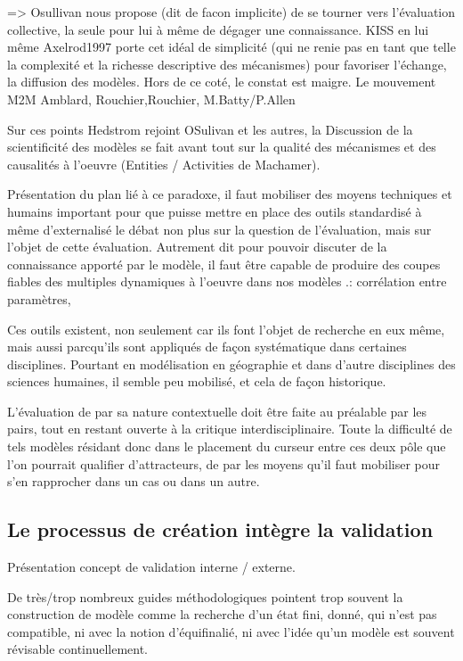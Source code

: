 {=> Osullivan nous propose (dit de facon implicite) de se tourner  vers l'évaluation collective, la seule pour lui à même de dégager une connaissance. KISS en lui même {Axelrod1997} porte cet idéal de simplicité (qui ne renie pas en tant que telle la complexité et la richesse descriptive des mécanismes) pour favoriser l'échange, la diffusion des modèles. Hors de ce coté, le constat est maigre. Le mouvement M2M {Amblard, Rouchier},{Rouchier}, {M.Batty/P.Allen}

Sur ces points Hedstrom rejoint OSulivan et les autres, la Discussion de la scientificité des modèles se fait avant tout sur la qualité des mécanismes et des causalités à l'oeuvre (Entities / Activities de Machamer).  

Présentation du plan lié à ce paradoxe, il faut mobiliser des moyens techniques et humains important pour que puisse mettre  en place des outils standardisé à même d'externalisé le débat non plus sur la question de l'évaluation, mais sur l'objet de cette évaluation. Autrement dit pour pouvoir discuter de la connaissance apporté par le modèle, il faut être capable de produire des coupes fiables des multiples dynamiques à l'oeuvre dans nos modèles .: corrélation entre paramètres, 

Ces outils existent, non seulement car ils font l'objet de recherche en eux même, mais aussi parcqu'ils sont appliqués de façon systématique dans certaines disciplines. Pourtant en modélisation en géographie et dans d'autre disciplines des sciences humaines, il semble peu mobilisé, et cela de façon historique.

L'évaluation de par sa nature contextuelle doit être faite au préalable par les pairs, tout en restant ouverte à la critique interdisciplinaire. Toute la difficulté de tels modèles résidant donc dans le placement du curseur entre ces deux pôle que l'on pourrait qualifier d'attracteurs, de par les moyens qu'il faut mobiliser pour s'en rapprocher dans un cas ou dans un autre.

\subsection{Le processus de création intègre la validation}

Présentation concept de validation interne / externe.

De très/trop nombreux guides méthodologiques pointent trop souvent la construction de modèle comme la recherche d'un état fini, donné, qui n'est pas compatible, ni avec la notion d'équifinalié, ni avec l'idée qu'un modèle est souvent révisable continuellement.

}
